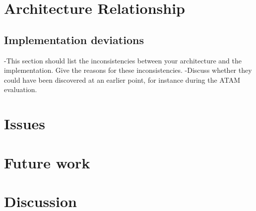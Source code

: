 \documentclass[12pt, a4paper]{article}
\begin{document}
\section{Architecture Relationship}
\subsection{Implementation deviations}
-This section should list the inconsistencies between your architecture and 
the implementation. Give the reasons for these inconsistencies. 
-Discuss whether they could have been discovered at an earlier point, for
instance during the ATAM evaluation.

\section{Issues}
\section{Future work}
\section{Discussion}
\end{document}
